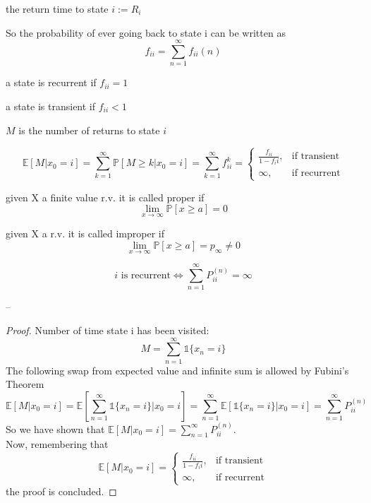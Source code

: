 \begin{definition}
the return time to state $i := R_i$
\end{definition}

So the probability of ever going back to state i can be written as
$$f_{ii} = \sum_{n=1}^\infty f_{ii}(n) $$

\begin{definition}
a state is recurrent if $f_{ii} = 1$
\end{definition}

\begin{definition}
a state is transient if  $f_{ii} < 1$
\end{definition}

\begin{definition}
$M$ is the number of returns to state $i$
\end{definition}

$$\mathbb{E}[M | x_0 = i] = \sum_{k=1}^\infty \mathbb{P}[M\geq k | x_0 = i] = \sum_{k=1}^\infty f_{ii}^k = \begin{cases}
\frac{f_{ii}}{1-f_ii}, & \mbox{if transient} \\
\infty, & \mbox{if recurrent}
\end{cases}$$

\begin{definition}[Proper r.v]
given X a finite value r.v. it is called proper if $$\lim_{x\to \infty} \mathbb{P}[x\geq a] = 0$$
\end{definition}

\begin{definition}[Improper r.v]
given X a r.v. it is called improper if  $$\lim_{x\to \infty} \mathbb{P}[x\geq a] = p_\infty \ne 0$$
\end{definition}


\begin{theorem}
$$i  \mbox{ is recurrent} \iff \sum_{n=1}^\infty P_{ii}^{(n)} = \infty$$
\end{theorem}
--
\begin{proof}
Number of time state i has been visited: $$M = \sum_{n=1}^\infty \mathds{1}\{x_n =i\} $$
The following swap from expected value and infinite sum is allowed by Fubini's Theorem$$ \mathbb{E}[M | x_0 = i] = \mathbb{E}[\sum_{n=1}^\infty \mathds{1}\{x_n = i\} | x_0 = i] = \sum_{n=1}^\infty \mathbb{E}[\mathds{1}\{ x_n = i\} | x_0 = i] = \sum_{n=1}^\infty P_{ii}^{(n)} $$
So we have shown that $\mathbb{E}[M | x_0=i] = \sum_{n=1}^\infty P_{ii}^{(n)}$.\\
Now, remembering that$$ \mathbb{E}[M | x_0 = i] = \begin{cases}
\frac{f_{ii}}{1-f_ii}, & \mbox{if transient} \\
\infty, & \mbox{if recurrent}
\end{cases}$$
the proof is concluded.
\end{proof}

